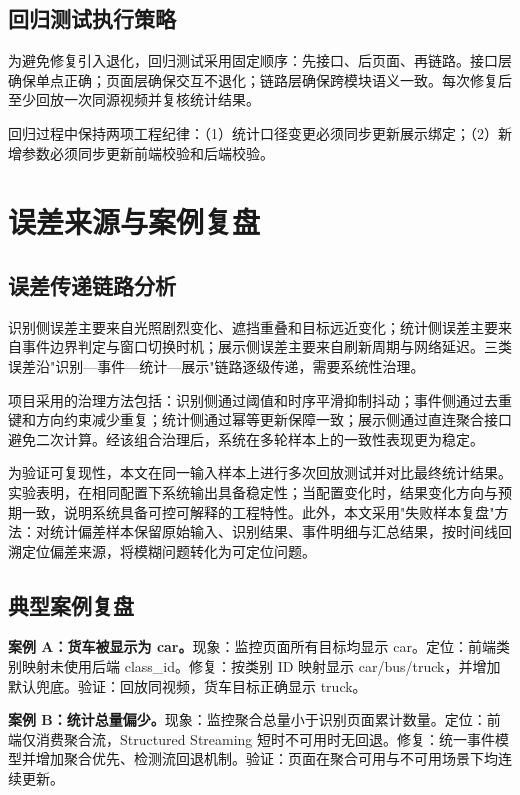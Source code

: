 \documentclass{wzuthesis} %
\begin{document}
\subsection{回归测试执行策略}

为避免修复引入退化，回归测试采用固定顺序：先接口、后页面、再链路。接口层确保单点正确；页面层确保交互不退化；链路层确保跨模块语义一致。每次修复后至少回放一次同源视频并复核统计结果。

回归过程中保持两项工程纪律：（1）统计口径变更必须同步更新展示绑定；（2）新增参数必须同步更新前端校验和后端校验。

\section{误差来源与案例复盘}

\subsection{误差传递链路分析}

识别侧误差主要来自光照剧烈变化、遮挡重叠和目标远近变化；统计侧误差主要来自事件边界判定与窗口切换时机；展示侧误差主要来自刷新周期与网络延迟。三类误差沿"识别—事件—统计—展示"链路逐级传递，需要系统性治理。

项目采用的治理方法包括：识别侧通过阈值和时序平滑抑制抖动；事件侧通过去重键和方向约束减少重复；统计侧通过幂等更新保障一致；展示侧通过直连聚合接口避免二次计算。经该组合治理后，系统在多轮样本上的一致性表现更为稳定。

为验证可复现性，本文在同一输入样本上进行多次回放测试并对比最终统计结果。实验表明，在相同配置下系统输出具备稳定性；当配置变化时，结果变化方向与预期一致，说明系统具备可控可解释的工程特性。此外，本文采用"失败样本复盘"方法：对统计偏差样本保留原始输入、识别结果、事件明细与汇总结果，按时间线回溯定位偏差来源，将模糊问题转化为可定位问题。

\subsection{典型案例复盘}

\textbf{案例 A：货车被显示为 car。}现象：监控页面所有目标均显示 car。定位：前端类别映射未使用后端 class\_id。修复：按类别 ID 映射显示 car/bus/truck，并增加默认兜底。验证：回放同视频，货车目标正确显示 truck。

\textbf{案例 B：统计总量偏少。}现象：监控聚合总量小于识别页面累计数量。定位：前端仅消费聚合流，Structured Streaming 短时不可用时无回退。修复：统一事件模型并增加聚合优先、检测流回退机制。验证：页面在聚合可用与不可用场景下均连续更新。
\end{document}
